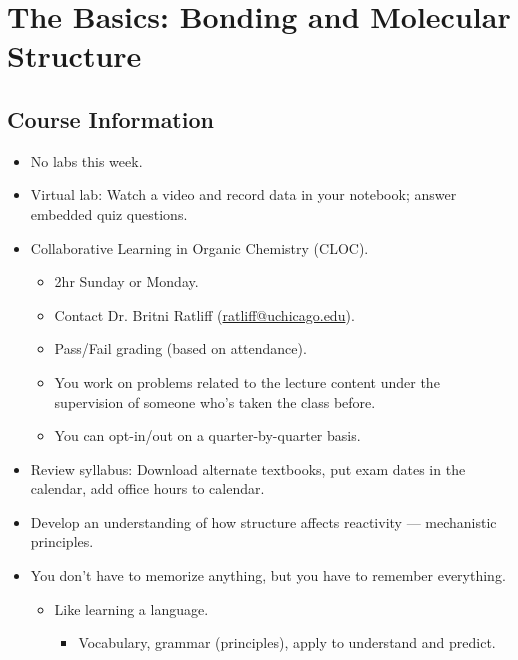 \documentclass[../notes.tex]{subfiles}
\begin{document}
\chapter{The Basics: Bonding and Molecular Structure}
\section{Course Information}
\begin{itemize}
    \item {}No labs this week.
    \item Virtual lab: Watch a video and record data in your notebook; answer embedded quiz questions.
    \item Collaborative Learning in Organic Chemistry (CLOC).
    \begin{itemize}
        \item 2hr Sunday or Monday.
        \item Contact Dr. Britni Ratliff (\href{mailto:ratliff@uchicago.edu}{ratliff@uchicago.edu}).
        \item Pass/Fail grading (based on attendance).
        \item You work on problems related to the lecture content under the supervision of someone who's taken the class before.
        \item You can opt-in/out on a quarter-by-quarter basis.
    \end{itemize}
    \item Review syllabus: Download alternate textbooks, put exam dates in the calendar, add office hours to calendar.
    \item Develop an understanding of how structure affects reactivity --- mechanistic principles.
    \item You don't have to memorize anything, but you have to remember everything.
    \begin{itemize}
        \item Like learning a language.
        \begin{itemize}
            \item Vocabulary, grammar (principles), apply to understand and predict.
        \end{itemize}
    \end{itemize}
\end{itemize}
\end{document}
